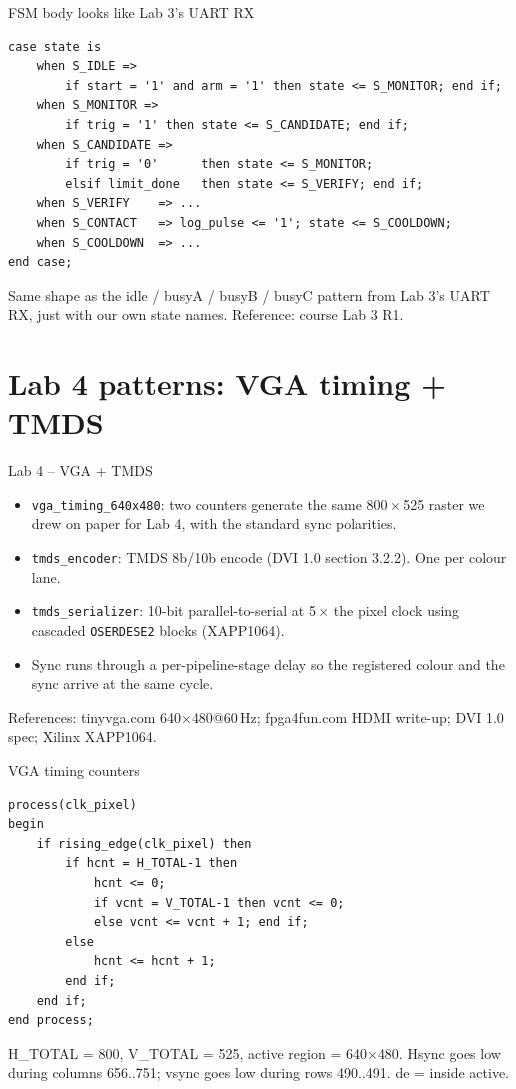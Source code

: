 \documentclass[aspectratio=169,10pt]{beamer}
\begin{document}
\begin{frame}[fragile]{FSM body looks like Lab 3's UART RX}
\begin{lstlisting}[style=vhdl]
case state is
    when S_IDLE =>
        if start = '1' and arm = '1' then state <= S_MONITOR; end if;
    when S_MONITOR =>
        if trig = '1' then state <= S_CANDIDATE; end if;
    when S_CANDIDATE =>
        if trig = '0'      then state <= S_MONITOR;
        elsif limit_done   then state <= S_VERIFY; end if;
    when S_VERIFY    => ...
    when S_CONTACT   => log_pulse <= '1'; state <= S_COOLDOWN;
    when S_COOLDOWN  => ...
end case;
\end{lstlisting}
    \scriptsize Same shape as the idle / busyA / busyB / busyC pattern
    from Lab 3's UART RX, just with our own state names. Reference:
    course Lab 3 R1.
\end{frame}

\section{Lab 4 patterns: VGA timing + TMDS}

\begin{frame}{Lab 4 -- VGA + TMDS}
    \begin{itemize}
        \item \texttt{vga\_timing\_640x480}: two counters generate the
              same 800\,$\times$\,525 raster we drew on paper for
              Lab 4, with the standard sync polarities.
        \item \texttt{tmds\_encoder}: TMDS 8b/10b encode (DVI 1.0
              section 3.2.2). One per colour lane.
        \item \texttt{tmds\_serializer}: 10-bit parallel-to-serial at
              5\,$\times$ the pixel clock using cascaded
              \texttt{OSERDESE2} blocks (XAPP1064).
        \item Sync runs through a per-pipeline-stage delay so the
              registered colour and the sync arrive at the same cycle.
    \end{itemize}
    \scriptsize References: tinyvga.com 640$\times$480@60\,Hz; fpga4fun.com
    HDMI write-up; DVI 1.0 spec; Xilinx XAPP1064.
\end{frame}

\begin{frame}[fragile]{VGA timing counters}
\begin{lstlisting}[style=vhdl]
process(clk_pixel)
begin
    if rising_edge(clk_pixel) then
        if hcnt = H_TOTAL-1 then
            hcnt <= 0;
            if vcnt = V_TOTAL-1 then vcnt <= 0;
            else vcnt <= vcnt + 1; end if;
        else
            hcnt <= hcnt + 1;
        end if;
    end if;
end process;
\end{lstlisting}
    H\_TOTAL = 800, V\_TOTAL = 525, active region = 640$\times$480.
    Hsync goes low during columns 656..751; vsync goes low during
    rows 490..491. de = inside active.
\end{frame}
\end{document}
